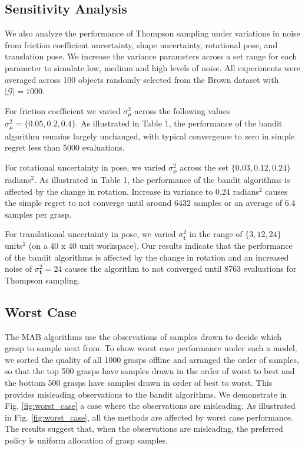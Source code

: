 \documentclass[10pt, conference]{ieeeconf}      %
\newcommand{\bt}{\mathbf{t}}
\newcommand{\mG}{\mathcal{G}}
\begin{document}
\subsection{Sensitivity Analysis }\label{sec:sensitivity}
We also analyze the performance of Thompson sampling under variations in noise from friction coefficient uncertainty, shape uncertainty, rotational pose, and translation pose.
We increase the variance parameters across a set range for each parameter to simulate low, medium and high levels of noise.
All experiments were averaged across 100 objects randomly selected  from the Brown dataset with $|\mG| = 1000$.

For friction coefficient we varied $\sigma^2_{\mu}$ across the following values $\sigma^2_{\mu} = \lbrace 0.05, 0.2, 0.4 \rbrace$.
As illustrated in Table 1, the performance of the bandit algorithm remains largely unchanged, with typical convergence to zero in simple regret less than 5000 evaluations.

For rotational uncertainty in pose, we varied $\sigma^2_{\phi}$ across the set $\lbrace 0.03, 0.12,0.24\rbrace$ radians$^2$. As illustrated in Table 1, the performance of the bandit algorithms is affected by the change in rotation. Increase in variance to $0.24$ radians$^2$  causes the  simple regret to not converge until around 6432 samples or an average of 6.4 samples per grasp. 

For translational uncertainty in pose, we varied $\sigma^2_{\bt}$ in the range of $\lbrace 3,12, 24 \rbrace$ units$^2$ (on a 40 x 40 unit workspace). Our results indicate that the performance of the bandit algorithms is affected by the change in rotation and an increased noise of $\sigma^2_{\bt} = 24$ causes the algorithm to not converged until 8763 evaluations for Thompson sampling. 



\subsection{Worst Case}
The MAB algorithms use the observations of samples drawn to decide which grasp to sample next from. To show worst case performance under such a model, we sorted the quality of all 1000 grasps offline and arranged the order of samples, so that the top 500 grasps have samples drawn in the order of worst to best and the bottom 500 grasps have samples drawn in order of best to worst. This provides misleading observations to the bandit algorithms. We demonstrate in Fig. \ref{fig:worst_case} a case where the observations are misleading. As illustrated in Fig. \ref{fig:worst_case}, all the methods are affected by worst case performance. The results suggest that, when the observations are misleading, the preferred policy is uniform allocation of grasp samples.
\end{document}
